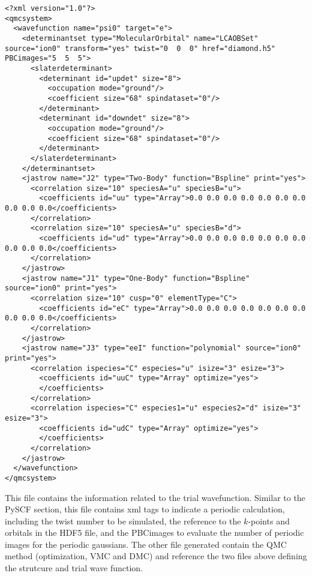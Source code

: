 \begin{lstlisting}[caption=diamond.wfj-Twist0.xml. This file contains the trial wave function]
<?xml version="1.0"?>
<qmcsystem>
  <wavefunction name="psi0" target="e">
    <determinantset type="MolecularOrbital" name="LCAOBSet" source="ion0" transform="yes" twist="0  0  0" href="diamond.h5" PBCimages="5  5  5">
      <slaterdeterminant>
        <determinant id="updet" size="8">
          <occupation mode="ground"/>
          <coefficient size="68" spindataset="0"/>
        </determinant>
        <determinant id="downdet" size="8">
          <occupation mode="ground"/>
          <coefficient size="68" spindataset="0"/>
        </determinant>
      </slaterdeterminant>
    </determinantset>
    <jastrow name="J2" type="Two-Body" function="Bspline" print="yes">
      <correlation size="10" speciesA="u" speciesB="u">
        <coefficients id="uu" type="Array">0.0 0.0 0.0 0.0 0.0 0.0 0.0 0.0 0.0 0.0</coefficients>
      </correlation>
      <correlation size="10" speciesA="u" speciesB="d">
        <coefficients id="ud" type="Array">0.0 0.0 0.0 0.0 0.0 0.0 0.0 0.0 0.0 0.0</coefficients>
      </correlation>
    </jastrow>
    <jastrow name="J1" type="One-Body" function="Bspline" source="ion0" print="yes">
      <correlation size="10" cusp="0" elementType="C">
        <coefficients id="eC" type="Array">0.0 0.0 0.0 0.0 0.0 0.0 0.0 0.0 0.0 0.0</coefficients>
      </correlation>
    </jastrow>
    <jastrow name="J3" type="eeI" function="polynomial" source="ion0" print="yes">
      <correlation ispecies="C" especies="u" isize="3" esize="3">
        <coefficients id="uuC" type="Array" optimize="yes">
        </coefficients>
      </correlation>
      <correlation ispecies="C" especies1="u" especies2="d" isize="3" esize="3">
        <coefficients id="udC" type="Array" optimize="yes">
        </coefficients>
      </correlation>
    </jastrow>
  </wavefunction>
</qmcsystem>
\end{lstlisting}
This file contains the information related to the trial wavefunction. 
Similar to the PySCF section, this file contains xml tags to indicate a periodic calculation, including the twist number to be simulated, the reference to the $k$-points and orbitals in the HDF5 file, and the PBCimages to evaluate the number of periodic images for the periodic gaussians.
The other file generated contain the QMC method (optimization, VMC and DMC) and reference the two files above defining the strutcure and trial wave function.
